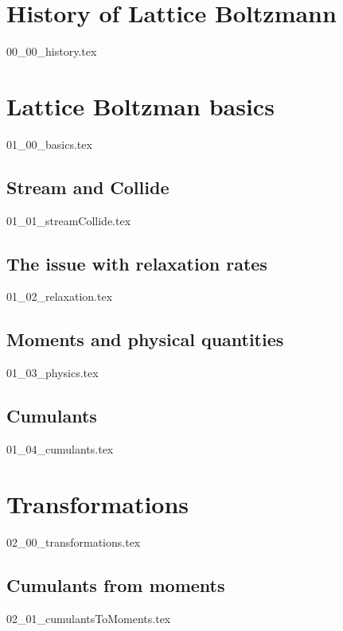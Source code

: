 \documentclass[12pt,a4paper,twoside]{article}
\begin{document}
\newpage
\tableofcontents
\newpage

\pagestyle{headings}

\section{History of Lattice Boltzmann}
\label{sec:History of Lattice Boltzmann}
{00_00_history.tex}

\section{Lattice Boltzman basics}
\label{sec:Lattice Boltzman basics}
{01_00_basics.tex}

\subsection{Stream and Collide}
\label{sub:Stream and Collide}
{01_01_streamCollide.tex}

\subsection{The issue with relaxation rates}
\label{sub: The issue with relaxation rates}
{01_02_relaxation.tex}

\subsection{Moments and physical quantities}
\label{sub: Moments and physical quantities}
{01_03_physics.tex}

\subsection{Cumulants}
\label{sub:Cumulants}
{01_04_cumulants.tex}

\section{Transformations}
\label{sec:Transformations}
{02_00_transformations.tex}

\subsection{Cumulants from moments}
\label{sub:Cumulants from moments}
{02_01_cumulantsToMoments.tex}
\end{document}
